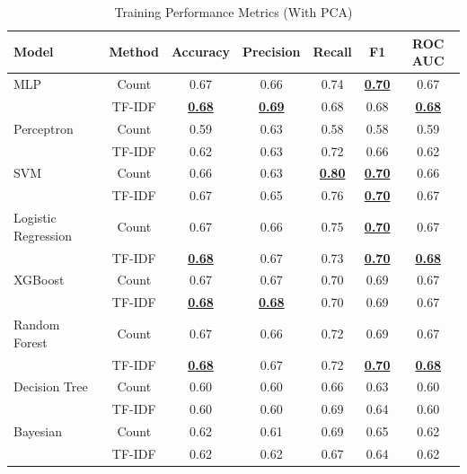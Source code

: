 \begin{table}[H]
    \centering
    \caption{Training Performance Metrics (With PCA)}
    \label{tab:pca-training}
    \begin{tabular}{|l|c|c|c|c|c|c|}
        \hline
        \textbf{Model} & \textbf{Method} & \textbf{Accuracy} & \textbf{Precision} & \textbf{Recall} & \textbf{F1} & \textbf{ROC AUC} \\
        \hline
        MLP & Count & 0.67 & 0.66 & 0.74 & \textbf{\underline{0.70}} & 0.67 \\
        & TF-IDF & \textbf{\underline{0.68}} & \textbf{\underline{0.69}} & 0.68 & 0.68 & \textbf{\underline{0.68}} \\
        \hline
        Perceptron & Count & 0.59 & 0.63 & 0.58 & 0.58 & 0.59 \\
        & TF-IDF & 0.62 & 0.63 & 0.72 & 0.66 & 0.62 \\
        \hline
        SVM & Count & 0.66 & 0.63 & \textbf{\underline{0.80}} & \textbf{\underline{0.70}} & 0.66 \\
        & TF-IDF & 0.67 & 0.65 & 0.76 & \textbf{\underline{0.70}} & 0.67 \\
        \hline
        Logistic Regression & Count & 0.67 & 0.66 & 0.75 & \textbf{\underline{0.70}} & 0.67 \\
        & TF-IDF & \textbf{\underline{0.68}} & 0.67 & 0.73 & \textbf{\underline{0.70}} & \textbf{\underline{0.68}} \\
        \hline
        XGBoost & Count & 0.67 & 0.67 & 0.70 & 0.69 & 0.67 \\
        & TF-IDF & \textbf{\underline{0.68}} & \textbf{\underline{0.68}} & 0.70 & 0.69 & 0.67 \\
        \hline
        Random Forest & Count & 0.67 & 0.66 & 0.72 & 0.69 & 0.67 \\
        & TF-IDF & \textbf{\underline{0.68}} & 0.67 & 0.72 & \textbf{\underline{0.70}} & \textbf{\underline{0.68}} \\
        \hline
        Decision Tree & Count & 0.60 & 0.60 & 0.66 & 0.63 & 0.60 \\
        & TF-IDF & 0.60 & 0.60 & 0.69 & 0.64 & 0.60 \\
        \hline
        Bayesian & Count & 0.62 & 0.61 & 0.69 & 0.65 & 0.62 \\
        & TF-IDF & 0.62 & 0.62 & 0.67 & 0.64 & 0.62 \\
        \hline
    \end{tabular}
\end{table}

